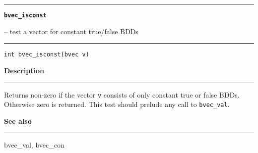 \vspace{8ex}
\begin{minipage}{\textwidth}

\noindent\begin{minipage}{\textwidth}
\rule{\textwidth}{0.5mm}
{\tt\bf bvec\_isconst }
\--- test a vector for constant true/false BDDs  \hspace{\fill}
\\\rule[1.5ex]{\textwidth}{0.5mm}
\end{minipage}

\noindent\begin{verbatim}
int bvec_isconst(bvec v) 
\end{verbatim}

\vspace{\parsep}\noindent
{\bf Description}\\\rule[1.5ex]{\textwidth}{0.2mm}\vspace{-1.5ex}\setlength{\parindent}{1em}
Returns non-zero if the vector {\tt v} consists of only constant
           true or false BDDs. Otherwise zero is returned. This test should
	   prelude any call to {\tt bvec\_val}. 

\vspace{\parsep}\vspace{\baselineskip}\noindent
{\bf See also}\\\rule[1.5ex]{\textwidth}{0.2mm}\vspace{-1.5ex}
bvec\_val, bvec\_con 
\end{minipage}
\vspace{8ex}
